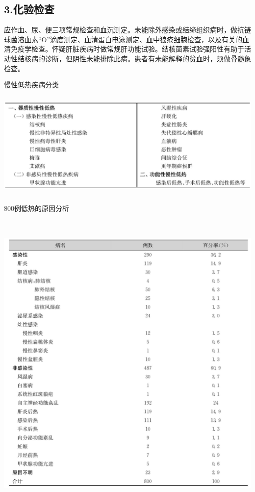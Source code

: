 \subsection{3.化验检查}

应作血、尿、便三项常规检查和血沉测定。未能除外感染或结缔组织病时，做抗链球菌溶血素“O”滴度测定、血清蛋白电泳测定、血中狼疮细胞检查，以及有关的血清免疫学检查。怀疑肝脏疾病时做常规肝功能试验。结核菌素试验强阳性有助于活动性结核病的诊断，但阴性未能排除此病。患者有未能解释的贫血时，须做骨髓象检查。

\begin{table}[htbp]
\centering
\caption{慢性低热疾病分类}
\label{tab2-23}
\includegraphics[width=5.875in,height=2.08333in]{./images/Image00030.jpg}
\end{table}

\begin{table}[htbp]
\centering
\caption{800例低热的原因分析}
\label{tab2-24}
\includegraphics[width=6.03125in,height=6.08333in]{./images/Image00031.jpg}
\end{table}

